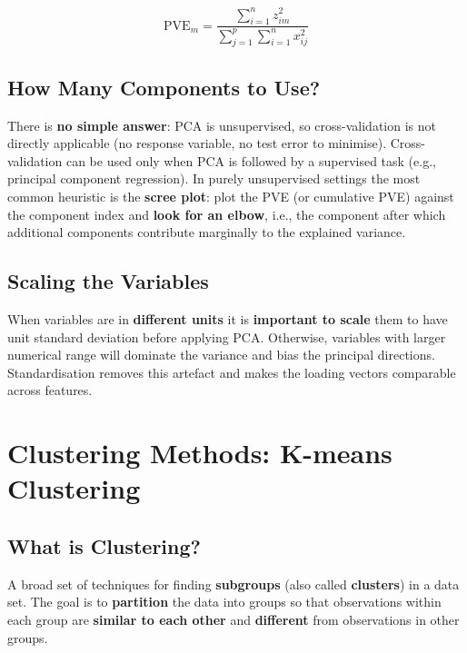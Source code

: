 \documentclass[11pt,a4paper]{article}
\theoremstyle{definition}
\theoremstyle{plain}
\theoremstyle{remark}
\begin{document}
\begin{tcolorbox}[colback=blue!5!white,colframe=blue!75!black,title=\textbf{PVE Formula}]
\[
    \mathrm{PVE}_m = \frac{\sum_{i=1}^{n} z_{im}^2}{\sum_{j=1}^{p} \sum_{i=1}^{n} x_{ij}^2}
\]
\end{tcolorbox}

\subsection{How Many Components to Use?}

There is \textbf{no simple answer}: PCA is unsupervised, so cross-validation is not directly applicable (no response variable, no test error to minimise). Cross-validation can be used only when PCA is followed by a supervised task (e.g., principal component regression). In purely unsupervised settings the most common heuristic is the \textbf{scree plot}: plot the PVE (or cumulative PVE) against the component index and \textbf{look for an elbow}, i.e., the component after which additional components contribute marginally to the explained variance.

\subsection{Scaling the Variables}

When variables are in \textbf{different units} it is \textbf{important to scale} them to have unit standard deviation before applying PCA. Otherwise, variables with larger numerical range will dominate the variance and bias the principal directions. Standardisation removes this artefact and makes the loading vectors comparable across features.


\section{Clustering Methods: K-means Clustering}

\subsection{What is Clustering?}

\begin{tcolorbox}[colback=blue!5!white,colframe=blue!75!black,title=\textbf{Clustering}]
A broad set of techniques for finding \textbf{subgroups} (also called \textbf{clusters}) in a data set. The goal is to \textbf{partition} the data into groups so that observations within each group are \textbf{similar to each other} and \textbf{different} from observations in other groups.
\end{tcolorbox}
\end{document}
